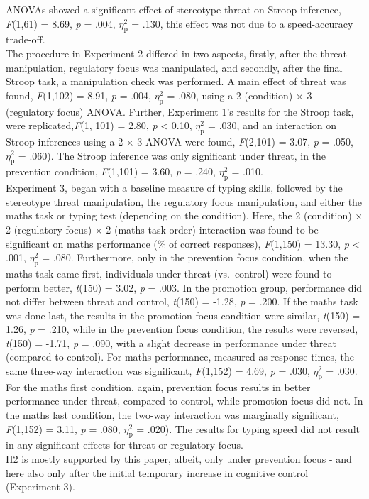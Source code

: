 \documentclass[
  stu,floatsintext]{apa7}
\begin{document}
ANOVAs showed a significant effect of stereotype threat on Stroop inference, \emph{F}(1,61) = 8.69, \emph{p} = .004, \(\eta^{2}_{\text{p}}\) = .130, this effect was not due to a speed-accuracy trade-off.\\
The procedure in Experiment 2 differed in two aspects, firstly, after the threat manipulation, regulatory focus was manipulated, and secondly, after the final Stroop task, a manipulation check was performed.
A main effect of threat was found, \emph{F}(1,102) = 8.91, \emph{p} = .004, \(\eta^{2}_{\text{p}}\) = .080, using a 2 (condition) \(\times\) 3 (regulatory focus) ANOVA.
Further, Experiment 1's results for the Stroop task, were replicated,\emph{F}(1, 101) = 2.80, \emph{p} \textless{} 0.10, \(\eta^{2}_{\text{p}}\) = .030, and an interaction on Stroop inferences using a 2 \(\times\) 3 ANOVA were found, \emph{F}(2,101) = 3.07, \emph{p} = .050, \(\eta^{2}_{\text{p}}\) = .060).
The Stroop inference was only significant under threat, in the prevention condition, \emph{F}(1,101) = 3.60, \emph{p} = .240, \(\eta^{2}_{\text{p}}\) = .010.\\
Experiment 3, began with a baseline measure of typing skills, followed by the stereotype threat manipulation, the regulatory focus manipulation, and either the maths task or typing test (depending on the condition).
Here, the 2 (condition) \(\times\) 2 (regulatory focus) \(\times\) 2 (maths task order) interaction was found to be significant on maths performance (\% of correct responses), \emph{F}(1,150) = 13.30, \emph{p} \textless{} .001, \(\eta^{2}_{\text{p}}\) = .080.
Furthermore, only in the prevention focus condition, when the maths task came first, individuals under threat (vs.~control) were found to perform better, \emph{t}(150) = 3.02, \emph{p} = .003.
In the promotion group, performance did not differ between threat and control, \emph{t}(150) = -1.28, \emph{p} = .200.
If the maths task was done last, the results in the promotion focus condition were similar, \emph{t}(150) = 1.26, \emph{p} = .210, while in the prevention focus condition, the results were reversed, \emph{t}(150) = -1.71, \emph{p} = .090, with a slight decrease in performance under threat (compared to control).
For maths performance, measured as response times, the same three-way interaction was significant, \emph{F}(1,152) = 4.69, \emph{p} = .030, \(\eta^{2}_{\text{p}}\) = .030.
For the maths first condition, again, prevention focus results in better performance under threat, compared to control, while promotion focus did not.
In the maths last condition, the two-way interaction was marginally significant, \emph{F}(1,152) = 3.11, \emph{p} = .080, \(\eta^{2}_{\text{p}}\) = .020).
The results for typing speed did not result in any significant effects for threat or regulatory focus.\\
H2 is mostly supported by this paper, albeit, only under prevention focus - and here also only after the initial temporary increase in cognitive control (Experiment 3).
\end{document}
